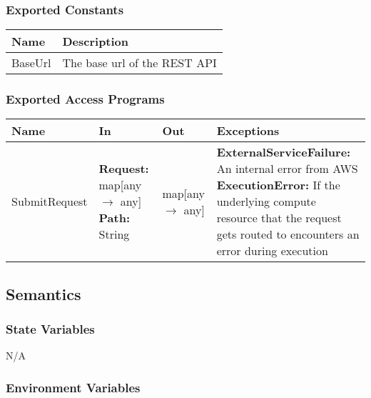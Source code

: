 \documentclass[12pt, titlepage]{article}
\begin{document}
{  \subsubsection{Exported Constants}

  \begin{center}
    \begin{tabular}{p{4cm} p{12cm}}
      \hline
      \textbf{Name} & \textbf{Description} \\
      \hline
      BaseUrl & The base url of the REST API \\
      \hline
    \end{tabular}
  \end{center}

  \subsubsection{Exported Access Programs}

  \begin{center}
    \begin{tabular}{>{\raggedright}p{3cm} >{\raggedright}p{5cm}
      >{\raggedright}p{4cm} p{4cm}}
      \hline
      \textbf{Name} & \textbf{In} & \textbf{Out} & \textbf{Exceptions} \\
      \hline
      SubmitRequest & \textbf{Request:} map[any $\rightarrow$ any]
      \newline \textbf{Path:} String & map[any $\rightarrow$ any] &
      \textbf{ExternalServiceFailure:} An internal error from
      AWS \newline \textbf{ExecutionError:} If the underlying compute
      resource that the request gets routed to encounters an error
      during execution \\
      \hline
    \end{tabular}
  \end{center}

  \subsection{Semantics}

  \subsubsection{State Variables}

  N/A

  \subsubsection{Environment Variables}

}
\end{document}
